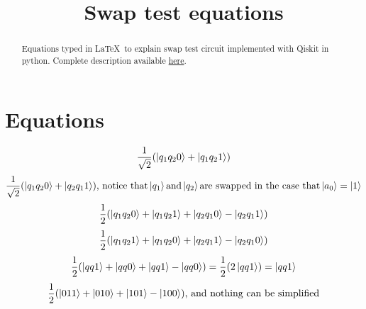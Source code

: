 \documentclass[]{article}
\title{Swap test equations}
\author{}
\date{}
\begin{document}
\maketitle

\begin{abstract}
	Equations typed in \LaTeX\ to explain swap test circuit implemented with Qiskit in python. Complete description available \href{https://github.com/epelaaez/QuantumCircuits/tree/master/algorithms/swap_test}{here}.
\end{abstract}

\section*{Equations}

\begin{equation*}
\frac{1}{\sqrt{2}}(\ket{q_1q_20} + \ket{q_1q_21})
\end{equation*}
\begin{equation*}
\frac{1}{\sqrt{2}}(\ket{q_1q_20} + \ket{q_2q_11})\textrm{, notice that} \ket{q_1} \textrm{and} \ket{q_2} \textrm{are swapped in the case that} \ket{a_0} = \ket{1}
\end{equation*}
\begin{equation*}
\frac{1}{2}(\ket{q_1q_20} + \ket{q_1q_21} + \ket{q_2q_10} - \ket{q_2q_11})
\end{equation*}
\begin{equation*}
\frac{1}{2}(\ket{q_1q_21} + \ket{q_1q_20} + \ket{q_2q_11} - \ket{q_2q_10})
\end{equation*}
\begin{equation*}
\frac{1}{2}(\ket{qq1} + \ket{qq0} + \ket{qq1} - \ket{qq0}) = \frac{1}{2}(2\ket{qq1}) = \ket{qq1}
\end{equation*}
\begin{equation*}
\frac{1}{2}(\ket{011} + \ket{010} + \ket{101} - \ket{100})\textrm{, and nothing can be simplified}
\end{equation*}
\end{document}
